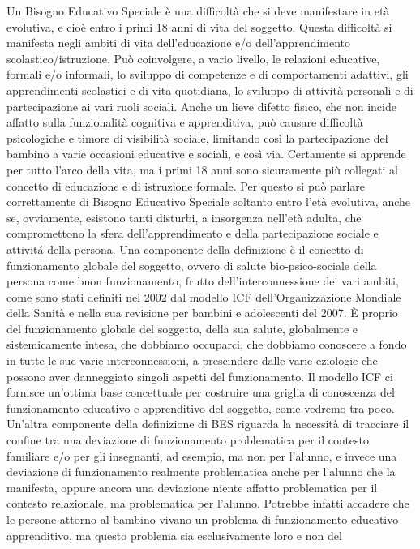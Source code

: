 Un Bisogno Educativo Speciale è una difficoltà che si deve manifestare in età evolutiva, e cioè
entro i primi 18 anni di vita del soggetto.
Questa difficoltà si manifesta negli ambiti di vita dell’educazione e/o dell’apprendimento
scolastico/istruzione. Può coinvolgere, a vario livello, le relazioni educative, formali e/o informali,
lo sviluppo di competenze e di comportamenti adattivi, gli apprendimenti scolastici e di vita
quotidiana, lo sviluppo di attività personali e di partecipazione ai vari ruoli sociali. Anche un lieve
difetto fisico, che non incide affatto sulla funzionalità cognitiva e apprenditiva, può causare
difficoltà psicologiche e timore di visibilità sociale, limitando così la partecipazione del bambino a
varie occasioni educative e sociali, e così via.
Certamente si apprende per tutto l’arco della vita, ma i primi 18 anni sono sicuramente più
collegati al concetto di educazione e di istruzione formale. Per questo si può parlare correttamente
di Bisogno Educativo Speciale soltanto entro l’età evolutiva, anche se, ovviamente, esistono tanti
disturbi, a insorgenza nell’età adulta, che compromettono la sfera dell’apprendimento e della
partecipazione sociale e attivitá della persona.
Una componente della definizione è il concetto di funzionamento globale del soggetto, ovvero
di salute bio-psico-sociale della persona come buon funzionamento, frutto dell’interconnessione
dei vari ambiti, come sono stati definiti nel 2002 dal modello ICF dell’Organizzazione Mondiale
della Sanità e nella sua revisione per bambini e adolescenti del 2007. È proprio del funzionamento
globale del soggetto, della sua salute, globalmente e sistemicamente intesa, che dobbiamo
occuparci, che dobbiamo conoscere a fondo in tutte le sue varie interconnessioni, a prescindere
dalle varie eziologie che possono aver danneggiato singoli aspetti del funzionamento. Il modello
ICF ci fornisce un’ottima base concettuale per costruire una griglia di conoscenza del
funzionamento educativo e apprenditivo del soggetto, come vedremo tra poco.
Un'altra componente della definizione di BES riguarda la necessità di tracciare il confine tra
una deviazione di funzionamento problematica per il contesto familiare e/o per gli insegnanti, ad
esempio, ma non per l'alunno, e invece una deviazione di funzionamento realmente problematica
anche per l'alunno che la manifesta, oppure ancora una deviazione niente affatto problematica per
il contesto relazionale, ma problematica per l'alunno.
Potrebbe infatti accadere che le persone attorno al bambino vivano un problema di
funzionamento educativo-apprenditivo, ma questo problema sia esclusivamente loro e non del
